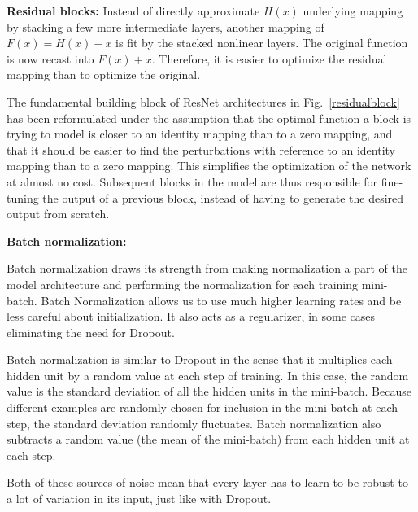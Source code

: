 \documentclass[conference]{IEEEtran}
\begin{document}
\textbf{Residual blocks:} Instead of directly approximate $H(x)$ underlying
mapping by stacking a few more intermediate layers, another mapping of
$F(x) = H(x) - x$ is fit  by the stacked nonlinear layers. The original
function is now recast into $F(x) + x$. Therefore, it is easier to optimize
the residual mapping than to optimize the original.


The fundamental building block of ResNet architectures in
Fig.~\ref{residualblock} has been reformulated under the assumption that the
optimal function a block is trying to model is closer to an identity mapping
than to a zero mapping, and that it should be easier to find the perturbations
with reference to an identity mapping than to a zero mapping. This simplifies
the optimization of the network at almost no cost. Subsequent blocks in the
model are thus responsible for fine-tuning the output of a previous block,
instead of having to generate the desired output from scratch.

\textbf{Batch normalization:} 

Batch normalization draws its strength from making normalization a part of the
model architecture and performing the normalization for each training
mini-batch. Batch Normalization allows us to use much higher learning rates and
be less careful about initialization. It also acts as a regularizer, in some
cases eliminating the need for Dropout.

Batch normalization is similar to Dropout in the sense that it multiplies each
hidden unit by a random value at each step of training. In this case, the random
value is the standard deviation of all the hidden units in the mini-batch.
Because different examples are randomly chosen for inclusion in the
mini-batch at each step, the standard deviation randomly fluctuates. Batch
normalization also subtracts a random value (the mean of the mini-batch) from
each hidden unit at each step.

Both of these sources of noise mean that every layer has to learn to be robust
to a lot of variation in its input, just like with Dropout.
\end{document}
